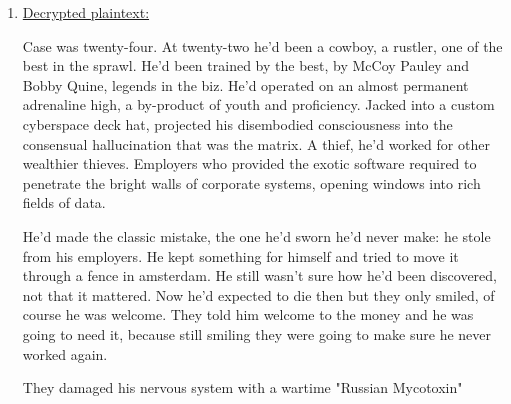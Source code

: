\documentclass{assignment}
\begin{document}
\begin{problemlist}
\begin{problem}
\begin{answer}
\begin{enumerate}
					\item \underline{Decrypted plaintext:}
	
					\par Case was twenty-four. At twenty-two he'd been a cowboy, a rustler, one of 
					the best in the sprawl. He'd been trained by the best, by McCoy Pauley and Bobby Quine, 
					legends in the biz. He'd operated on an almost permanent adrenaline high, a by-product 
					of youth and proficiency. Jacked into a custom cyberspace deck hat, projected his 
					disembodied consciousness into the consensual hallucination that was the matrix. A thief, 
					he'd worked for other wealthier thieves. Employers who provided the exotic software 
					required to penetrate the bright walls of corporate systems, opening windows into rich 
					fields of data.\\
	
					\par He'd made the classic mistake, the one he'd sworn he'd never make: he stole from 
					his employers. He kept something for himself and tried to move it through a fence in 
					amsterdam. He still wasn't sure how he'd been discovered, not that it mattered. Now he'd 
					expected to die then but they only smiled, of course he was welcome. They told him welcome 
					to the money and he was going to need it, because still smiling they were going to make 
					sure he never worked again.\\
	
					\par They damaged his nervous system with a wartime "Russian Mycotoxin" \\
					

\end{enumerate}
\end{answer}
\end{problem}
\end{problemlist}
\end{document}
